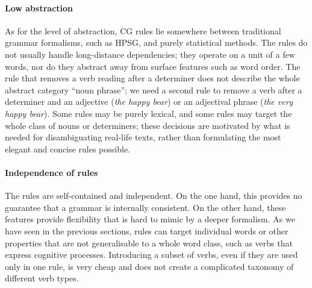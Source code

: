 




\paragraph{Low abstraction} 

As for the level of abstraction, CG rules lie somewhere between 
traditional grammar formalisms, such as HPSG, and purely statistical methods.
The rules do not usually handle long-distance dependencies; 
they operate on a unit of a few words, nor do they abstract away from surface features such as word order.
The rule that removes a verb reading after a determiner
does not describe the whole abstract category ``noun phrase''; we need a second
rule to remove a verb after a determiner and an adjective (\emph{the happy bear}) 
or an adjectival phrase (\emph{the very happy bear}).
Some rules may be purely lexical, and some rules may target the whole class of nouns or determiners; these decisions are motivated by what is needed for disambiguating real-life texts, rather than formulating the most elegant and concise rules possible.



\paragraph{Independence of rules}
The rules are self-contained and independent.
On the one hand, this provides no guarantee that a grammar is internally consistent.
On the other hand, these features provide flexibility that is hard to mimic by a deeper formalism.
As we have seen in the previous sections, rules can target individual words
or other properties that are not generalisable to a whole word class,
such as verbs that express cognitive processes.
Introducing a subset of verbs, even if they are used only in one rule,
is very cheap and does not create a complicated taxonomy of different verb types.

